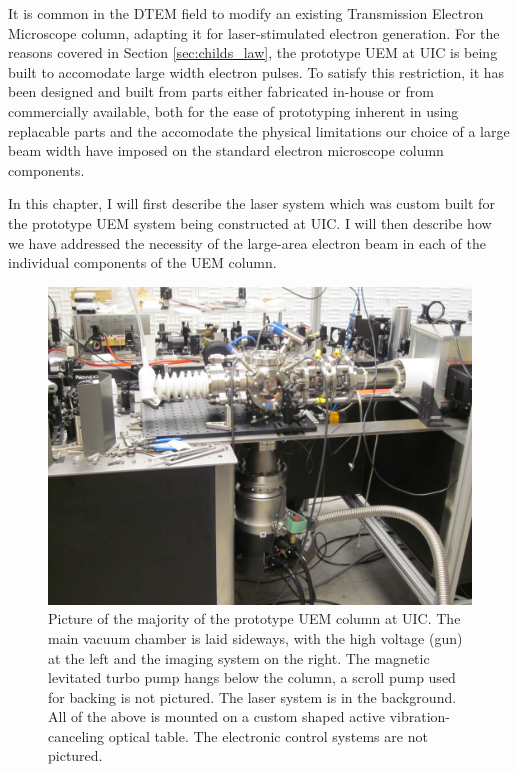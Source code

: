 
It is common in the DTEM field to modify an existing Transmission Electron Microscope column, adapting it for laser-stimulated electron generation.
For the reasons covered in Section \ref{sec:childs_law}, the prototype UEM at UIC is being built to accomodate large width electron pulses.
To satisfy this restriction, it has been designed and built from parts either fabricated in-house or from commercially available, both for the ease of prototyping inherent in using replacable parts and the accomodate the physical limitations our choice of a large beam width have imposed on the standard electron microscope column components.

In this chapter, I will first describe the laser system which was custom built for the prototype UEM system being constructed at UIC.
I will then describe how we have addressed the necessity of the large-area electron beam in each of the individual components of the UEM column.

\begin{figure}
  \centering
  \includegraphics{inc/hardware/column.jpg}
  \caption[Picture of the prototype UEM column at UIC]{
    Picture of the majority of the prototype UEM column at UIC.
    The main vacuum chamber is laid sideways, with the high voltage (gun) at the left and the imaging system on the right.
    The magnetic levitated turbo pump hangs below the column, a scroll pump used for backing is not pictured.
    The laser system is in the background.
    All of the above is mounted on a custom shaped active vibration-canceling optical table.
    The electronic control systems are not pictured.
  }
  \label{fig:column-pic}
\end{figure}


